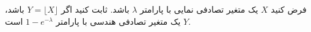 \problem{}
فرض کنید \( X \) یک متغیر تصادفی نمایی با پارامتر \( \lambda \) باشد.
 ثابت کنید اگر \( Y = \lfloor X \rfloor \) باشد، \( Y \) یک متغیر تصادفی هندسی با پارامتر 
\( 1 - e^{-\lambda} \)
است.
